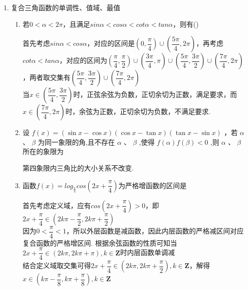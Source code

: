 \begin{enumerate}
\item 复合三角函数的单调性、值域、最值
    \begin{enumerate}
        \item 若$0 < \alpha < 2\pi$，且满足$sin\alpha < cos\alpha < cot\alpha < tan\alpha$，则有\dotfill()
        \begin{jieda}
            首先考虑$sin\alpha < cos\alpha$，对应的区间是$(0, \dfrac{\pi}{4})\cup(\dfrac{5\pi}{4}, 2\pi)$，再考虑$cot\alpha < tan\alpha$，对应的区间为$(\dfrac{\pi}{4}, \dfrac{\pi}{2}) \cup (\dfrac{3\pi}{4}, \pi) \cup (\dfrac{5\pi}{4}, \dfrac{3\pi}{2}) \cup (\dfrac{7\pi}{4}, 2\pi)$，两者取交集有$(\dfrac{5\pi}{4}, \dfrac{3\pi}{2}) \cup (\dfrac{7\pi}{4}, 2\pi)$ \\
            当$x \in (\dfrac{5\pi}{4}, \dfrac{3\pi}{2})$时，正弦余弦为负数，正切余切为正数，满足要求，而$x \in (\dfrac{7\pi}{4}, 2\pi)$时，余弦为正数，正切余切为负数，不满足要求.
        \end{jieda}
        \item 设 $f\left( x\right)  = \left( {\sin x - \cos x}\right) \left( {\cos x - \tan x}\right) \left( {\tan x - \sin x}\right)$ ，若 $\alpha$ 、 $\beta$ 为同一象限的角,且不存在 $\alpha \text{ 、 }\beta$ ,使得 $f\left( \alpha \right) f\left( \beta \right)  < 0$ ,则 $\alpha \text{ 、 }\beta$ 所在的象限为 
        \begin{jieda}
            第四象限内三角比的大小关系不改变.
        \end{jieda}
        \item 函数$f(x) = log_{\frac{\pi}{4}}cos(2x+\dfrac{\pi}{4})$为严格增函数的区间是
        \begin{jieda}
            首先考虑定义域，应有$cos(2x+\dfrac{\pi}{4}) > 0$，即$2x + \dfrac{\pi}{4} \in (2k\pi - \dfrac{\pi}{2}, 2k\pi + \dfrac{\pi}{2})$ \\
            因为$0 < \dfrac{\pi}{4} < 1$，所以外层函数是减函数，因此内层函数的严格减区间对应复合函数的严格增区间. 根据余弦函数的性质可知当$2x+\dfrac{\pi}{4} \in (2k\pi, 2k\pi+\pi), k \in \mathbf{Z}$时内层函数单调减 \\
            结合定义域取交集可得$2x+\dfrac{\pi}{4} \in (2k\pi, 2k\pi + \dfrac{\pi}{2}), k \in \mathbf{Z}$，解得$x \in  (k\pi - \dfrac{\pi}{8}, k\pi + \dfrac{\pi}{8}), k\in \mathbf{Z}$

\end{jieda}
\end{enumerate}
\end{enumerate}
